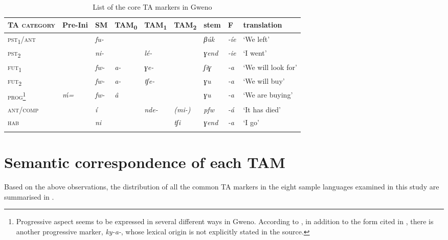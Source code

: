 \documentclass[output=paper]{langscibook}
\begin{document}
\begin{table}
\small
\begin{tabularx}{\textwidth}{>{\scshape}llllllllQ}
\lsptoprule
{\normalfont TA category} & {Pre-Ini} & SM & {TAM\textsubscript{0}} & {TAM\textsubscript{1}} & {TAM\textsubscript{2}} & stem & F & {translation}\\
\midrule
{pst\textsubscript{1}/ant} &  & {\itshape fu-} &  &  &  & {\itshape βúk} & {\itshape {}-íe} & `We left'\\
{pst\textsubscript{2}}      &  & {\itshape ni-} &  & {\itshape lé-} &  & {\itshape ɣend} & {\itshape {}-ie} & `I went'\\
{fut\textsubscript{1}}      &  & {\itshape fw-} & {\itshape a-} & {\itshape ɣe-} &  & {\itshape ʃiɣ} & {\itshape {}-a} & `We will look for'\\
{fut\textsubscript{2}}      &  & {\itshape fw-} & {\itshape a-} & {\itshape tʃe-} &  & {\itshape ɣu} & {\itshape {}-a} & `We will buy'\\
{prog\footnote{Progressive aspect seems to be expressed in several different ways in Gweno. According to \citet[253]{PhilippsonNurse2000}, in addition to the form cited in , there is another progressive marker, \textit{ky-a-}, whose lexical origin is not explicitly stated in the source.}} 
                            & {\itshape ḿ=} & {\itshape fw-} & {\itshape â} &  &  & {\itshape ɣu} & {\itshape {}-a} & `We are buying'\\
ant/comp                    &  & {\itshape í} &  & {\itshape nde-} & {\itshape (mi-)} & {\itshape pfw} & {\itshape {}-á} & `It has died'\\
{hab}                       &  & {\itshape ni} &  &  & {\itshape tʃi} & {\itshape ɣend} & {\itshape {}-a} & `I go'\\
\lspbottomrule
\end{tabularx}
\caption{List of the core TA markers in Gweno}
\label{tab:shinagawa:8}
\end{table}


\section{Semantic correspondence of each TAM}\label{sec:shinagawa:3}

  Based on the above observations, the distribution of all the common TA markers in the eight sample languages examined in this study are summarised in .
\end{document}
